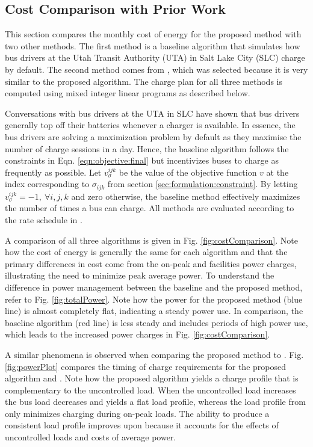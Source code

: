 \subsection{Cost Comparison with Prior Work\label{sec:results:prior}} 
This section compares the monthly cost of energy for the proposed method with two other methods. The first method is a baseline algorithm that simulates how bus drivers at the Utah Transit Authority (UTA) in Salt Lake City (SLC) charge by default. The second method comes from \cite{He_2019_Fast}, which was selected because it is very similar to the proposed algorithm. The charge plan for all three methods is computed using mixed integer linear programs as described below.  
\par Conversations with bus drivers at the UTA in SLC have shown that bus drivers generally top off their batteries whenever a charger is available. In essence, the bus drivers are solving a maximization problem by default as they maximise the number of charge sessions in a day. Hence, the baseline algorithm follows the constraints in Eqn. \eqref{eqn:objective:final} but incentivizes buses to charge as frequently as possible. Let $v_{\sigma}^{ijk}$ be the value of the objective function $v$ at the index corresponding to $\sigma_{ijk}$ from section \ref{sec:formulation:constraint}. By letting $v^{ijk}_{\sigma} = -1, \ \forall i,j,k$ and zero otherwise, the baseline method effectively maximizes the number of times a bus can charge.  
 All methods are evaluated according to the rate schedule in \cite{rocky_mountain_power_rocky_2021}. 
 \par A comparison of all three algorithms is given in Fig. \ref{fig:costComparison}. Note how the cost of energy is generally the same for each algorithm and that the primary differences in cost come from the on-peak and facilities power charges, illustrating the need to minimize peak average power. To understand the difference in power management between the baseline and the proposed method, refer to Fig. \ref{fig:totalPower}. Note how the power for the proposed method (blue line) is almost completely flat, indicating a steady power use. In comparison, the baseline algorithm (red line) is less steady and includes periods of high power use, which leads to the increased power charges in Fig. \ref{fig:costComparison}.
 \par A similar phenomena is observed when comparing the proposed method to \cite{He_2019_Fast}. Fig. \ref{fig:powerPlot} compares the timing of charge requirements for the proposed algorithm and \cite{He_2019_Fast}.  Note how the proposed algorithm yields a charge profile that is complementary to the uncontrolled load.  When the uncontrolled load increases the bus load decreases and yields a flat load profile, whereas the load profile from \cite{He_2019_Fast} only minimizes charging during on-peak loads. The ability to produce a consistent load profile improves upon \cite{He_2019_Fast} because it accounts for the effects of uncontrolled loads and costs of average power. 

